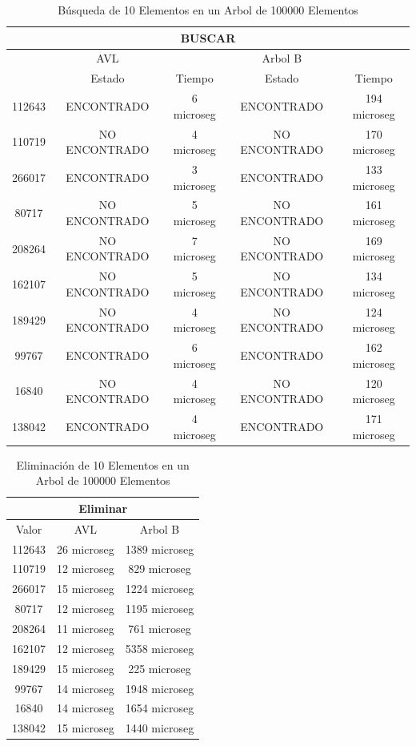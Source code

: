 \documentclass[acmsmall]{acmart}
\begin{document}
\begin{table}[htbp]
\begin{center}
  \caption{Búsqueda de 10 Elementos en un Arbol de 100000 Elementos}
  \begin{tabular}{ccccc}
    \toprule
    \multicolumn{5}{c}{BUSCAR}\\
    \midrule
     \, & AVL &\, & Arbol B & \,\\
     \, &Estado&Tiempo&Estado&Tiempo \\
     
      112643 &ENCONTRADO&6 microseg&ENCONTRADO&194 microseg \\
      110719 &NO ENCONTRADO&4 microseg&NO ENCONTRADO&170 microseg \\
      266017 &ENCONTRADO&3 microseg& ENCONTRADO&133 microseg \\
      80717 &NO ENCONTRADO&5 microseg&NO ENCONTRADO&161 microseg \\
      208264 &NO ENCONTRADO&7 microseg&NO ENCONTRADO&169 microseg \\
      162107 &NO ENCONTRADO&5 microseg&NO ENCONTRADO&134 microseg \\
      189429 &NO ENCONTRADO&4 microseg&NO ENCONTRADO&124 microseg \\
      99767 &ENCONTRADO&6 microseg&ENCONTRADO&162 microseg \\
       16840 &NO ENCONTRADO&4 microseg&NO ENCONTRADO&120 microseg \\
      138042 &ENCONTRADO&4 microseg&ENCONTRADO&171 microseg \\

    \bottomrule
  \end{tabular}
  \end{center}
\end{table}

\begin{table}[htbp]
\begin{center}
  \caption{Eliminación de 10 Elementos en un Arbol de 100000 Elementos}
  \begin{tabular}{ccc}
    \toprule
    \multicolumn{3}{c}{Eliminar}\\
    \midrule
     Valor & AVL & Arbol B\\
      112643 &26 microseg&1389 microseg \\
      110719 &12 microseg&829 microseg \\
      266017 &15 microseg&1224 microseg \\
      80717 &12 microseg&1195 microseg \\
      208264 &11 microseg&761 microseg \\
      162107 &12 microseg&5358 microseg \\
      189429 &15 microseg&225 microseg \\
      99767 &14 microseg&1948 microseg \\
       16840 &14 microseg&1654 microseg \\
      138042 &15 microseg&1440 microseg \\


    \bottomrule
  \end{tabular}
  \end{center}
\end{table}
\end{document}
